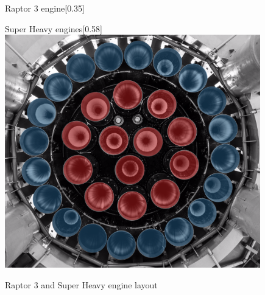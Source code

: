 \begin{figure}[H]
\begin{subcaptionbox}{Raptor 3 engine\footnotemark[1]\label{fig:Raptor_3}}[0.35\linewidth]
    \end{subcaptionbox}
    \hfill
    \begin{subcaptionbox}{Super Heavy engines\footnotemark[2]\label{fig:SuperHeavyEngines}}[0.58\linewidth]
        {\includegraphics[width=\linewidth]{figures/LiteratureStudy/SuperHeavyRaptorLayour.png}}
    \end{subcaptionbox}
    \caption{Raptor 3 and Super Heavy engine layout}
    \label{fig:Raptor_Comparison}
\end{figure}